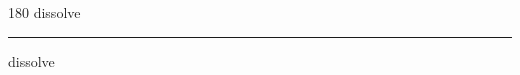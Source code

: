 
\begin{frame}
\begin{center}
\begin{turn}{180}
{\fontsize{2.5cm}{1em}\selectfont dissolve}
\end{turn}
\vspace{1em}\par  
\hrule
\vspace{1em}\par  
{\fontsize{2.5cm}{1em}\selectfont dissolve}
\end{center}
\end{frame}
